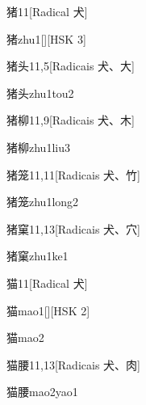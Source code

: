 \begin{entry}{猪}{11}[Radical ⽝]
  \begin{phonetics}{猪}{zhu1}[][HSK 3]
  \end{phonetics}
\end{entry}

\begin{entry}{猪头}{11,5}[Radicais ⽝、⼤]
  \begin{phonetics}{猪头}{zhu1tou2}
  \end{phonetics}
\end{entry}

\begin{entry}{猪柳}{11,9}[Radicais ⽝、⽊]
  \begin{phonetics}{猪柳}{zhu1liu3}
  \end{phonetics}
\end{entry}

\begin{entry}{猪笼}{11,11}[Radicais ⽝、⽵]
  \begin{phonetics}{猪笼}{zhu1long2}
  \end{phonetics}
\end{entry}

\begin{entry}{猪窠}{11,13}[Radicais ⽝、⽳]
  \begin{phonetics}{猪窠}{zhu1ke1}
  \end{phonetics}
\end{entry}

\begin{entry}{猫}{11}[Radical ⽝]
  \begin{phonetics}{猫}{mao1}[][HSK 2]
  \end{phonetics}
  \begin{phonetics}{猫}{mao2}
  \end{phonetics}
\end{entry}

\begin{entry}{猫腰}{11,13}[Radicais ⽝、⾁]
  \begin{phonetics}{猫腰}{mao2yao1}
  \end{phonetics}
\end{entry}

